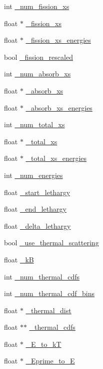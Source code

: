 \begin{DoxyCompactItemize}
\item 
int \hyperlink{classIsotope_a688301f0767515be67cf27b8f7cad9e3}{\-\_\-num\-\_\-fission\-\_\-xs}
\item 
float $\ast$ \hyperlink{classIsotope_a721d2479a71910c0b49b4620cecb3ac6}{\-\_\-fission\-\_\-xs}
\item 
float $\ast$ \hyperlink{classIsotope_a03dc2cba22e9f2617df7e373cafb475a}{\-\_\-fission\-\_\-xs\-\_\-energies}
\item 
bool \hyperlink{classIsotope_ad1517dc6fb03724d33fc40dee7ba6132}{\-\_\-fission\-\_\-rescaled}
\item 
int \hyperlink{classIsotope_aa197f9184aae95b37bcfb89c6c456a8f}{\-\_\-num\-\_\-absorb\-\_\-xs}
\item 
float $\ast$ \hyperlink{classIsotope_a5e2b7ab969ffd103532c60af032436a0}{\-\_\-absorb\-\_\-xs}
\item 
float $\ast$ \hyperlink{classIsotope_a151aab960bd2cee02c2eb665d09f2da8}{\-\_\-absorb\-\_\-xs\-\_\-energies}
\item 
int \hyperlink{classIsotope_a2e143d4521991dc55cbef4e6c5f02796}{\-\_\-num\-\_\-total\-\_\-xs}
\item 
float $\ast$ \hyperlink{classIsotope_a92906b0ef21e25db8688b239d6dbfb58}{\-\_\-total\-\_\-xs}
\item 
float $\ast$ \hyperlink{classIsotope_a143a0cbba4e478f064cda7ce9ee0e8fb}{\-\_\-total\-\_\-xs\-\_\-energies}
\item 
int \hyperlink{classIsotope_ac4ce8fc4065448051ff608573c65c35d}{\-\_\-num\-\_\-energies}
\item 
float \hyperlink{classIsotope_a96d70bb50adb0ae65f5134a895349a34}{\-\_\-start\-\_\-lethargy}
\item 
float \hyperlink{classIsotope_ab94eea749f1536859dcd6c89c514a614}{\-\_\-end\-\_\-lethargy}
\item 
float \hyperlink{classIsotope_a8210420d4d05778761b1c3f113553b5e}{\-\_\-delta\-\_\-lethargy}
\item 
bool \hyperlink{classIsotope_aabb478cc4ceefb44824230c03d68c881}{\-\_\-use\-\_\-thermal\-\_\-scattering}
\item 
float \hyperlink{classIsotope_a9ca004efbe18d4777529a7ae2c499e4b}{\-\_\-k\-B}
\item 
int \hyperlink{classIsotope_abf995cc9b729abb1000a2b487e935910}{\-\_\-num\-\_\-thermal\-\_\-cdfs}
\item 
int \hyperlink{classIsotope_afebdcf957b234c7118d9717c5a91a501}{\-\_\-num\-\_\-thermal\-\_\-cdf\-\_\-bins}
\item 
float $\ast$ \hyperlink{classIsotope_a75f6f039420234ae8d2fd8ee54e5592d}{\-\_\-thermal\-\_\-dist}
\item 
float $\ast$$\ast$ \hyperlink{classIsotope_a273dfb14475d3d16c5c8ed37dababfa5}{\-\_\-thermal\-\_\-cdfs}
\item 
float $\ast$ \hyperlink{classIsotope_a99e9d62aea621b33e5250b3def9079f6}{\-\_\-\-E\-\_\-to\-\_\-k\-T}
\item 
float $\ast$ \hyperlink{classIsotope_a3f3437fabe8c5b6108080f150b854fda}{\-\_\-\-Eprime\-\_\-to\-\_\-\-E}
\end{DoxyCompactItemize}


